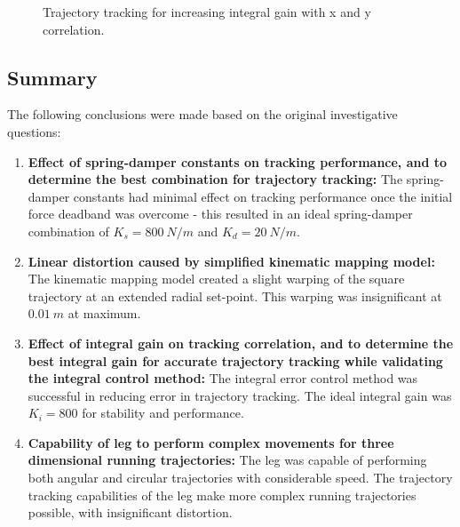 \begin{figure}
\caption{Trajectory tracking for increasing integral gain with x and y correlation.}
\label{fig:Trajectory tracking for increasing integral gain}
\end{figure}

\subsection{Summary}

The following conclusions were made based on the original investigative questions:

\begin{enumerate}
\item \textbf{Effect of spring-damper constants on tracking performance, and to determine the best combination for trajectory tracking:} The spring-damper constants had minimal effect on tracking performance once the initial force deadband was overcome - this resulted in an ideal spring-damper combination of $K_s = 800\ N/m$ and $K_d = 20\ N/m$.
\item \textbf{Linear distortion caused by simplified kinematic mapping model:} The kinematic mapping model created a slight warping of the square trajectory at an extended radial set-point. This warping was insignificant at $0.01\ m$ at maximum.
\item \textbf{Effect of integral gain on tracking correlation, and to determine the best integral gain for accurate trajectory tracking while validating the integral control method:} The integral error control method was successful in reducing error in trajectory tracking. The ideal integral gain was $K_i = 800$ for stability and performance.
\item \textbf{Capability of leg to perform complex movements for three dimensional running trajectories:} The leg was capable of performing both angular and circular trajectories with considerable speed. The trajectory tracking capabilities of the leg make more complex running trajectories possible, with insignificant distortion. 
\end{enumerate}